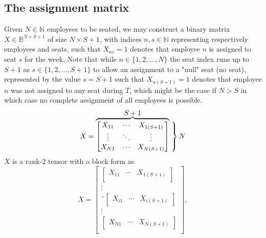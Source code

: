 \documentclass[10pt]{article}
\theoremstyle{definition}
\theoremstyle{plain}
\theoremstyle{remark}
\begin{document}
	
	
	\subsection{The assignment matrix}
	Given $N\in\mathbb{N}$ employees to be seated, we may construct a binary matrix $X\in \mathbb{B}^{N\times S+1}$ of size $N \times S+1$, with indices $n,s\in\mathbb{N}$ representing respectively employees and seats, such that $X_{ns} = 1$ denotes that employee $n$ is assigned to seat $s$ for the week. Note that while $n\in\{1,2,\dots,N\}$ the seat index runs up to $S+1$ as $s\in\{1,2,\dots,S+1\}$ to allow an assignment to a "null" seat (no seat), represented by the value $s = S+1$ such that $X_{n(S+1)}=1$ denotes that employee $n$ was not assigned to any seat during $T$, which might be the case if $N > S$ in which case no complete assignment of all employees is possible. 
	\begin{equation}
		X = \overbrace{
			\begin{bmatrix}
				X_{11} & \cdots & X_{1(S+1)} \\
				\vdots & \ddots & \vdots \\
				X_{N1} & \cdots & X_{N(S+1)}
			\end{bmatrix}
		}^{\displaystyle S+1}
		\left.
		\vphantom{
			\begin{bmatrix}
				X_{11} \\ \vdots \\ X_{N1}
			\end{bmatrix}
		}
		\right\} N
	\end{equation}
	$X$ is a rank-2 tensor with a block form as
	\begin{equation}
		X = \begin{bmatrix}
			\begin{bmatrix}
				X_{11} & \cdots & X_{1(S+1)} \\
			\end{bmatrix}\\
			\vdots \\¨
			\begin{bmatrix}
				X_{i1} & \cdots & X_{i(S+1)}
			\end{bmatrix}\\
			\vdots\\
			\begin{bmatrix}
				X_{N1} & \cdots & X_{N(S+1)}
			\end{bmatrix}\\
		\end{bmatrix},
	\end{equation}
\end{document}
